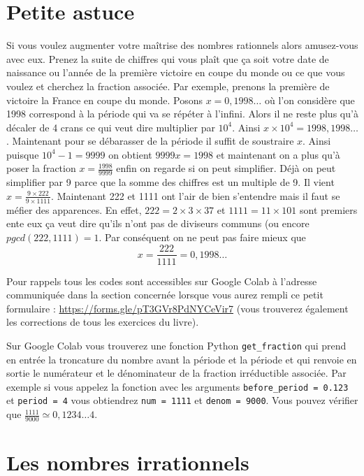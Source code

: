 \documentclass[a4paper, 11pt, twoside]{book}
\begin{document}
\section{Petite astuce}
\label{sec:org67927a1}
Si vous voulez augmenter votre maîtrise des nombres rationnels
alors amusez-vous avec eux. Prenez la suite de chiffres qui vous
plaît que ça soit votre date de naissance ou l'année de la
première victoire en coupe du monde ou ce que vous voulez et
cherchez la fraction associée. Par exemple, prenons la première
de victoire la France en coupe du monde. Posons \(x = 0,1998\dots\)
où l'on considère que 1998 correspond à la période qui va se
répéter à l'infini. Alors il ne reste plus qu'à décaler de 4 crans
ce qui veut dire multiplier par \(10^4\). Ainsi \(x\times 10^4 =
    1998,1998\dots\). Maintenant pour se débarasser de la période il
suffit de soustraire \(x\). Ainsi puisque \(10^4 - 1 = 9999\) on
obtient \(9999x = 1998\) et maintenant on a plus qu'à poser la
fraction \(x = \frac{1998}{9999}\) enfin on regarde si on peut
simplifier. Déjà on peut simplifier par 9 parce que la somme des
chiffres est un multiple de 9. Il vient \(x = \frac{9\times
    222}{9\times 1111}\). Maintenant 222 et 1111 ont l'air de bien
s'entendre mais il faut se méfier des apparences. En effet, \(222 =
    2\times 3\times 37\) et \(1111 = 11\times 101\) sont premiers ente
eux ça veut dire qu'ils n'ont pas de diviseurs communs (ou encore
\(pgcd(222, 1111) = 1\). Par conséquent on ne peut pas faire mieux
que \[x = \dfrac{222}{1111} = 0,1998\dots\]


Pour rappels tous les codes sont accessibles sur Google Colab à
l'adresse communiquée dans la section concernée lorsque vous
aurez rempli ce petit formulaire :
\url{https://forms.gle/pT3GVr8PdNYCeVir7} (vous trouverez également
les corrections de tous les exercices du livre).

Sur Google Colab vous trouverez une fonction Python \texttt{get\_fraction}
qui prend en entrée la troncature du nombre avant la période et la
période et qui renvoie en sortie le numérateur et le dénominateur
de la fraction irréductible associée. Par exemple si vous appelez
la fonction avec les arguments \texttt{before\_period = 0.123} et \texttt{period
    = 4} vous obtiendrez \texttt{num = 1111} et \texttt{denom = 9000}. Vous pouvez
vérifier que \(\frac{1111}{9000} \simeq 0,1234\dots4\).

\section{Les nombres irrationnels}
\label{sec:org3e61135}
\end{document}
